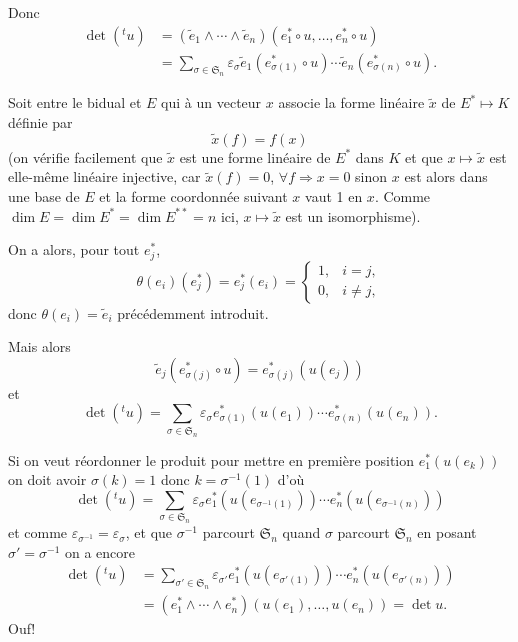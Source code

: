 Donc
\begin{align*}
\det({}^tu)&=(\widetilde e_1\wedge\cdots\wedge\widetilde e_n)(e_1^*\circ u,\ldots,e_n^*\circ u)\\
&=\sum_{\sigma\in\mathfrak S_n}\varepsilon_\sigma
\widetilde e_1(e_{\sigma(1)}^*\circ u)\cdots
\widetilde e_n(e_{\sigma(n)}^*\circ u).
\end{align*}

Soit  entre le bidual et $E$ qui à un vecteur $x$ associe la forme linéaire $\widetilde x$ de $E^*\longmapsto K$ définie par
\[
\widetilde x(f)=f(x)
\]
(on vérifie facilement que $\widetilde x$ est une forme linéaire de $E^*$ dans $K$ et que $x\longmapsto\widetilde x$ est elle-même linéaire injective, car $\widetilde x(f)=0$, $\forall f\Rightarrow x=0$ sinon $x$ est alors dans une base de $E$ et la forme coordonnée suivant $x$ vaut 1 en $x$. Comme $\dim E=\dim E^*=\dim E^{**}=n$ ici, $x\longmapsto\widetilde x$ est un isomorphisme).

On a alors, pour tout $e_j^*$,
\[
\theta(e_i)(e_j^*)=e_j^*(e_i)=
\begin{cases}1,&i=j,\\0,&i\ne j,\end{cases}
\]
donc $\theta(e_i)=\widetilde e_i$ précédemment introduit.

Mais alors
\[
\widetilde e_j(e_{\sigma(j)}^*\circ u)=e_{\sigma(j)}^*(u(e_j))
\]
et
\[
\det({}^tu)=\sum_{\sigma\in\mathfrak S_n}\varepsilon_\sigma
 e_{\sigma(1)}^*(u(e_1))\cdots e_{\sigma(n)}^*(u(e_n)).
\]

Si on veut réordonner le produit pour mettre en première position $e_1^*(u(e_k))$ on doit avoir $\sigma(k)=1$ donc $k=\sigma^{-1}(1)$ d'où
\[
\det({}^tu)=\sum_{\sigma\in\mathfrak S_n}\varepsilon_\sigma
 e_1^*(u(e_{\sigma^{-1}(1)}))\cdots e_n^*(u(e_{\sigma^{-1}(n)}))
\]
et comme $\varepsilon_{\sigma^{-1}}=\varepsilon_\sigma$, et que $\sigma^{-1}$ parcourt $\mathfrak S_n$ quand $\sigma$ parcourt $\mathfrak S_n$ en posant $\sigma'=\sigma^{-1}$ on a encore
\[
\begin{aligned}
\det({}^tu)
&=\sum_{\sigma'\in\mathfrak S_n}\varepsilon_{\sigma'}
 e_1^*(u(e_{\sigma'(1)}))\cdots e_n^*(u(e_{\sigma'(n)}))\\
&=(e_1^*\wedge\cdots\wedge e_n^*)(u(e_1),\ldots,u(e_n))=\det u.
\end{aligned}
\]
Ouf! \bookend

